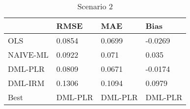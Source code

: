 \begin{table}[H]
\centering
\caption{Scenario 2}
\label{Scenario2}
\begin{tabular}{L{3.3333333333333335cm}L{2.6666666666666665cm}R{2.0cm}R{2.6666666666666665cm}}
\toprule
{} &     RMSE &      MAE &     Bias \\
\midrule
OLS      &   0.0854 &   0.0699 &  -0.0269 \\
NAIVE-ML &   0.0922 &    0.071 &    0.035 \\
DML-PLR  &   0.0809 &   0.0671 &  -0.0174 \\
DML-IRM  &   0.1306 &   0.1094 &   0.0979 \\
Best     &  DML-PLR &  DML-PLR &  DML-PLR \\
\bottomrule
\end{tabular}
\end{table}
